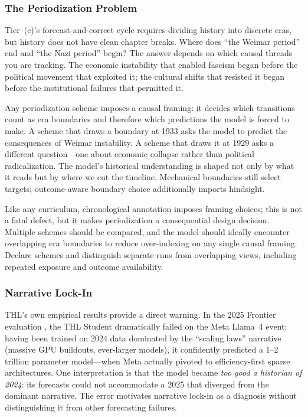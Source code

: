 \subsubsection{The Periodization Problem}

Tier~(c)'s forecast-and-correct cycle requires dividing history into discrete eras, but history does not have clean chapter breaks. Where does ``the Weimar period'' end and ``the Nazi period'' begin? The answer depends on which causal threads you are tracking. The economic instability that enabled fascism began before the political movement that exploited it; the cultural shifts that resisted it began before the institutional failures that permitted it.

Any periodization scheme imposes a causal framing: it decides which transitions count as era boundaries and therefore which predictions the model is forced to make. A scheme that draws a boundary at 1933 asks the model to predict the consequences of Weimar instability. A scheme that draws it at 1929 asks a different question---one about economic collapse rather than political radicalization. The model's historical understanding is shaped not only by what it reads but by where we cut the timeline. Mechanical boundaries still select targets; outcome-aware boundary choice additionally imports hindsight.

Like any curriculum, chronological annotation imposes framing choices; this is
not a fatal defect, but it makes periodization a consequential design decision.
Multiple schemes should be compared, and the model should ideally encounter
overlapping era boundaries to reduce over-indexing on any single causal framing. Declare schemes and distinguish separate runs from overlapping views, including repeated exposure and outcome availability.

\subsubsection{Narrative Lock-In}

THL's own empirical results provide a direct warning. In the 2025 Frontier evaluation \cite{westerberg2026thl}, the THL Student dramatically failed on the Meta Llama~4 event: having been trained on 2024 data dominated by the ``scaling laws'' narrative (massive GPU buildouts, ever-larger models), it confidently predicted a 1--2 trillion parameter model---when Meta actually pivoted to efficiency-first sparse architectures. One interpretation is that the model became \emph{too good a historian of 2024}: its forecasts could not accommodate a 2025 that diverged from the dominant narrative. The error motivates narrative lock-in as a diagnosis without distinguishing it from other forecasting failures.

